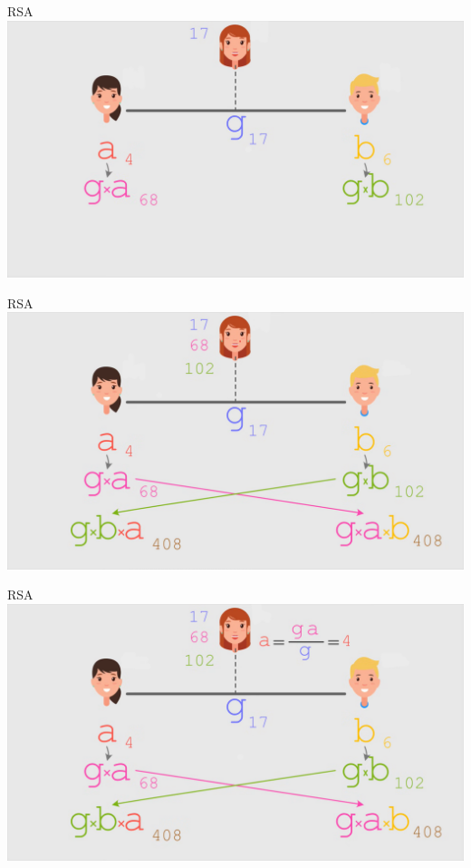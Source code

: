 \documentclass{beamer}
\begin{document}
\begin{frame}{RSA}
    \centering
    \includegraphics[width=\textwidth, height=0.9\textheight, keepaspectratio]{rsa 4.png}
\end{frame}

\begin{frame}{RSA}
    \centering
    \includegraphics[width=\textwidth, height=0.9\textheight, keepaspectratio]{rsa 5.png}
\end{frame}

\begin{frame}{RSA}
    \centering
    \includegraphics[width=\textwidth, height=0.9\textheight, keepaspectratio]{rsa 6.png}
\end{frame}
\end{document}
